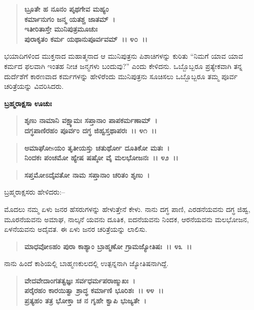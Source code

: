 \begin{verse}
\textbf{ಬ್ರೂತೇ ಹ ನೂನಂ ಪೃಥಗೇವ ಮಹ್ಯಂ} \\\textbf{ಕರ್ಮಾನುಗಂ ಜನ್ಮ ಯತಶ್ಚ ಜಾತಮ್~।}\\\textbf{ಇತೀರಿತಾಸ್ತೇ ಮುನಿಪುತ್ರಮೂಚುಃ} \\\textbf{ಪುರಾಕೃತಂ ಕರ್ಮ ಯಥಾನುಪೂರ್ವವಮ್~।। ೪೦~।।}
\end{verse}

ಭಯಾದಿಗಳಿಂದ ಮುಕ್ತನಾದ ಮಹಾತ್ಮನಾದ ಆ ಮುನಿಪುತ್ರನು ಪಿಶಾಚಿಗಳನ್ನು ಕುರಿತು “ನಿಮಗೆ ಯಾವ ಯಾವ ಕರ್ಮದ ಫಲವಾಗಿ ಇಂತಹ ನೀಚ ಜನ್ಮಗಳು ಬಂದುವು?” ಎಂದು ಕೇಳಿದನು. ಒಬ್ಬೊಬ್ಬರೂ ಪ್ರತ್ಯೇಕವಾಗಿ ತನ್ನ ದುರ್ದೆಶೆಗೆ ಕಾರಣವಾದ ಕರ್ಮಗಳನ್ನು ಹೇಳಿರೆಂದು ಮುನಿಪುತ್ರನು ಸೂಚಿಸಲು ಒಬ್ಬೊಬ್ಬರೂ ತಮ್ಮ ಪೂರ್ವ ಚರಿತ್ರೆಯನ್ನು ವಿವರಿಸಿದರು.

\begin{flushleft}
\textbf{ಬ್ರಹ್ಮರಾಕ್ಷಸಾ ಊಚುಃ}
\end{flushleft}

\begin{verse}
\textbf{ಶೃಣು ನಾಮಾನಿ ವಕ್ಷ್ಯಾಮಃ ಸಪ್ತಾನಾಂ ಪಾಪಕರ್ಮಣಾಮ್~।}\\\textbf{ದಗ್ಧಪಾಣಿರಹಂ ಪೂರ್ವಂ ದಗ್ಧ ಜಿಹ್ವಸ್ತಥಾಪರಃ~।। ೪೧~।। }
\end{verse}

\begin{verse}
\textbf{ಅಮಾಘೋsಯಂ ತೃತೀಯಸ್ತು ಚತುರ್ಥೋ ದೂತಿಕೋ ಮತಃ~।}\\\textbf{ನಿಂದಕಃ ಪಂಚಮೋ ಹ್ಯೇಷ ಷಷ್ಠೋ ವೈ ಮಲಭೋಜನಃ~।। ೪೨~।।}
\end{verse}

\begin{verse}
\textbf{ಸಪ್ತಮೋಽದೈವತೋ ನಾಮ ಸಪ್ತಾನಾಂ ಚರಿತಂ ಶೃಣು~।}
\end{verse}

\noindent
 ಬ್ರಹ್ಮರಾಕ್ಷಸರು ಹೇಳಿದರು:–

ಮೊದಲು ನಮ್ಮ ಏಳು ಜನರ ಹೆಸರುಗಳನ್ನು ಹೇಳುತ್ತೇನೆ ಕೇಳು. ನಾನು ದಗ್ಧ ಪಾಣಿ, ಎರಡನೆಯವನು ದಗ್ಧ ಜಿಹ್ವ, ಮೂರನೆಯವನು ಅಮಾಘ, ನಾಲ್ಕನೆ ಯವನು ದೂತಿಕ, ಐದನೆಯವನು ನಿಂದಕ, ಆರನೆಯವನು ಮಲಭೋಜನ, ಏಳನೆಯವನು ಅದೈವತ. ಈ ಏಳು ಜನರ ಚರಿತ್ರೆಯನ್ನು ಲಾಲಿಸು.

\begin{verse}
\textbf{ಮಾಧವೋಽಹಂ ಪುರಾ ಕಾಶ್ಯಾಂ ಬ್ರಾಹ್ಮಣೋ ಗ್ರಾಮಜ್ಯೋತಿಷಃ~।। ೪೩~।।}
\end{verse}

ನಾನು ಹಿಂದೆ ಕಾಶಿಯಲ್ಲಿ ಬಾಹ್ಮಣಕುಲದಲ್ಲಿ ಉತ್ಪನ್ನನಾಗಿ ಜ್ಯೋತಿಷನಾಗಿದ್ದೆ.

\begin{verse}
\textbf{ವೇದವೇದಾಂಗತತ್ವಜ್ಞಃ ಸರ್ವಧರ್ಮಪರಾಙ್ಮುಖಃ~।}\\\textbf{ಪರೈರಹಂ ಕಾರಯಿತ್ವಾ ಶ್ರಾದ್ಧ ಕರ್ಮಾಣಿ ಭೂರಿಶಃ~।। ೪೪~।। }\\\textbf{ಪ್ರತ್ಯಹಂ ತತ್ರ ಭೋಕ್ತಾ ಚ ನ ಗೃಹೇ ಕ್ವಾಪಿ ಭುಜ್ಯತೇ~।}
\end{verse}

